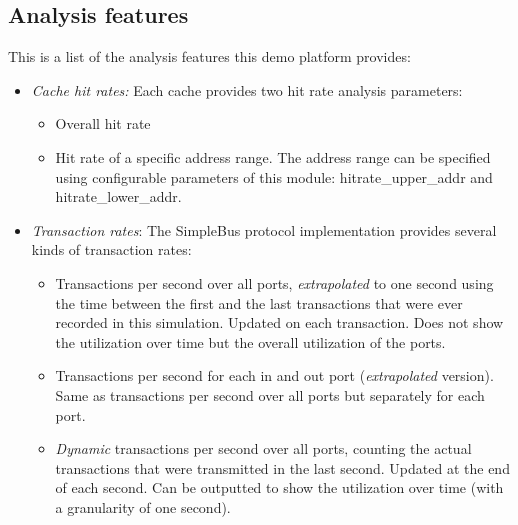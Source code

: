 \subsection{Analysis features}

This is a list of the analysis features this demo platform provides:

\begin{itemize}


   \item  {\em Cache hit rates:} \newline
  	 \newline
	Each cache provides two hit rate analysis parameters:
	\begin{itemize}
	  \item  Overall hit rate 
	  \item  Hit rate of a specific address range.
	  	The address range can be specified using configurable parameters of this module:
		{\sffamily hitrate\_upper\_addr} and {\sffamily hitrate\_lower\_addr}. 
	\end{itemize}

   \item   {\em Transaction rates}: \newline
     \newline
   	The SimpleBus protocol implementation provides several kinds of transaction rates:
		\begin{itemize}
		   \item Transactions per second over all ports, {\em extrapolated} to one second using
		the time between the first and the last transactions that were ever 
		recorded in this simulation. Updated on each transaction. Does not show the utilization 
		over time but the overall utilization of the ports.
	   \item  Transactions per second for each in and out port ({\em extrapolated} version). Same 
	   	as transactions per second over all ports but separately for each port.
	   \item  {\em Dynamic} transactions per second over all ports, counting the actual
			transactions that were transmitted in the last second. Updated at the 
			end of each second. Can be outputted to show the utilization over time
			(with a granularity of one second).
		\end{itemize}
		

\end{itemize}
